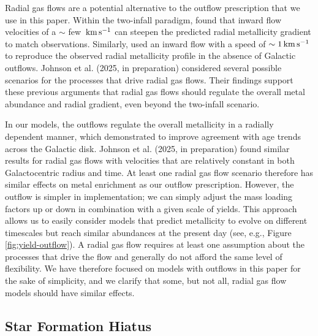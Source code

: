 \documentclass[twocolumn,twocolappendix,linenumbers]{aastex631}
\newcommand{\kms}{\,{\rm km}\,{\rm s}^{-1}}
\begin{document}
Radial gas flows are a potential alternative to the outflow prescription that we use in this paper. Within the two-infall paradigm, \citet{spitoni_effects_2011} found that inward flow velocities of a $\sim$ few $\kms$ can steepen the predicted radial metallicity gradient to match observations. Similarly, \citet{palla_chemical_2020,palla_mapping_2024} used an inward flow with a speed of $\sim1\kms$ to reproduce the observed radial metallicity profile in the absence of Galactic outflows. Johnson et al. (2025, in preparation) considered several possible scenarios for the processes that drive radial gas flows. Their findings support these previous arguments that radial gas flows should regulate the overall metal abundance and radial gradient, even beyond the two-infall scenario.

In our models, the outflows regulate the overall metallicity in a radially dependent manner, which \citet{johnson_milky_2024} demonstrated to improve agreement with age trends across the Galactic disk. Johnson et al. (2025, in preparation) found similar results for radial gas flows with velocities that are relatively constant in both Galactocentric radius and time. At least one radial gas flow scenario therefore has similar effects on metal enrichment as our outflow prescription. However, the outflow is simpler in implementation; we can simply adjust the mass loading factors up or down in combination with a given scale of yields. This approach allows us to easily consider models that predict metallicity to evolve on different timescales but reach similar abundances at the present day (see, e.g., Figure \ref{fig:yield-outflow}). A radial gas flow requires at least one assumption about the processes that drive the flow and generally do not afford the same level of flexibility. We have therefore focused on models with outflows in this paper for the sake of simplicity, and we clarify that some, but not all, radial gas flow models should have similar effects.

\subsection{Star Formation Hiatus}
\label{sec:sfe-hiatus}
\end{document}
